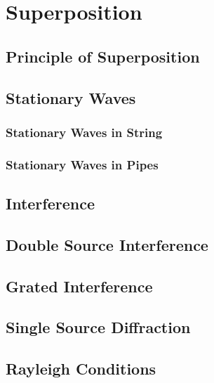 \documentclass[../main]{subfiles}
\begin{document}
\section{Superposition}

\subsection{Principle of Superposition}

\subsection{Stationary Waves}

\subsubsection{Stationary Waves in String}

\subsubsection{Stationary Waves in Pipes}

\subsection{Interference}

\subsection{Double Source Interference}

\subsection{Grated Interference}

\subsection{Single Source Diffraction}

\subsection{Rayleigh Conditions}
\end{document}
